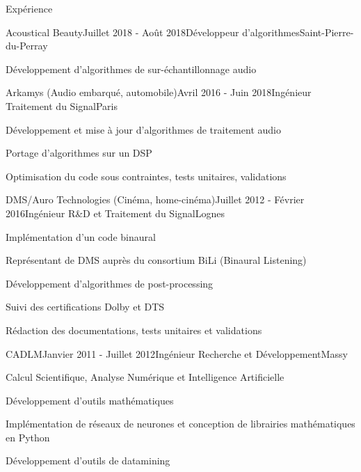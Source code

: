 \documentclass{resume} %
\begin{document}
	
\begin{rSection}{Expérience}

\begin{rSubsection}{Acoustical Beauty}{Juillet 2018 - Août 2018}{Développeur d'algorithmes}{Saint-Pierre-du-Perray}
\item Développement d'algorithmes de sur-échantillonnage audio
\end{rSubsection}


\begin{rSubsection}{Arkamys (Audio embarqué, automobile)}{Avril 2016 - Juin 2018}{Ingénieur Traitement du Signal}{Paris}
\item Développement et mise à jour d'algorithmes de traitement audio
\item Portage d'algorithmes sur un DSP
\item Optimisation du code sous contraintes, tests unitaires, validations
\end{rSubsection}


\begin{rSubsection}{DMS/Auro Technologies (Cinéma, home-cinéma)}{Juillet 2012 - Février 2016}{Ingénieur R\&D et Traitement du Signal}{Lognes}
\item Implémentation d'un code binaural
\item Représentant de DMS auprès du consortium BiLi (Binaural Listening)
\item Développement d'algorithmes de post-processing
\item Suivi des certifications Dolby et DTS
\item Rédaction des documentations, tests unitaires et validations
\end{rSubsection}


\begin{rSubsection}{CADLM}{Janvier 2011 - Juillet 2012}{Ingénieur Recherche et Développement}{Massy}
\item Calcul Scientifique, Analyse Numérique et Intelligence Artificielle
\item Développement d'outils mathématiques
\item Implémentation de réseaux de neurones et conception de librairies mathématiques en Python
\item Développement d'outils de datamining
\end{rSubsection}


\end{rSection}
\end{document}
